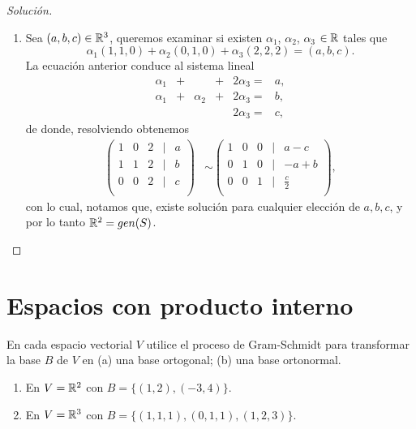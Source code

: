 \documentclass[a4,11pt]{aleph-notas}
\begin{document}
\begin{proof}[Solución]
\begin{enumerate}
        \item Sea $(a, b, c) \in \mathbb{R}^3$, queremos examinar si existen $\alpha_1$, $\alpha_2$, $\alpha_3$  $\in \mathbb{R}$ tales que  
        \[
        \alpha_{1} (1, 1, 0) + \alpha_{2} (0, 1, 0) + \alpha_{3} (2, 2, 2) =(a, b, c).
        \]
        La ecuación anterior conduce al sistema lineal
        \[
        \begin{array}{rrrrrrr}
         \alpha _{1} & + & & + & 2\alpha_{3} = & a, \\
         \alpha _{1} & + &\alpha_{2}& + &2\alpha_{3}= & b,\\
         & & & &2\alpha_{3}= & c,
         \end{array}
         \]
         de donde, resolviendo obtenemos
        \begin{align*}
        \begin{pmatrix}
            1&0&2&|&a\\
            1&1&2&|&b\\
            0&0&2&|&c\\
        \end{pmatrix}
        & \sim 
        \begin{pmatrix}
            1&0&0&|&a-c\\
            0&1&0&|&-a+b\\
            0&0&1&|&\frac{c}{2}\\
        \end{pmatrix},
        \end{align*}
        con lo cual, notamos que, existe solución para cualquier elección de $a, b, c$, y por lo tanto $\mathbb{R}^2 = gen (S)$. \qedhere
    \end{enumerate}
\end{proof}

\section{Espacios con producto interno}

\begin{ejer}
    En cada espacio vectorial $V$ utilice el proceso de Gram-Schmidt para transformar la base $B$ de $V$ en (a) una base ortogonal; (b) una base ortonormal.
    \begin{enumerate}
        \item En $V=\mathbb{R}^{2}$ con $B=\{(1, 2), (-3, 4)\}$.
        \item En $V=\mathbb{R}^{3}$ con $B=\{(1, 1, 1), (0, 1, 1), (1, 2, 3)\}$.
    \end{enumerate}
\end{ejer}
\end{document}
